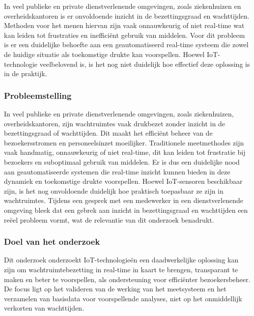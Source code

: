 

In veel publieke en private dienstverlenende omgevingen, zoals ziekenhuizen en overheidskantoren is er onvoldoende inzicht in de bezettingsgraad en wachttijden. Methoden voor het menen hiervan zijn vaak onnauwkeurig of niet real-time wat kan leiden tot frustraties en inefficiënt gebruik van middelen. Voor dit probleem is er een duidelijke behoefte aan een geautomatiseerd real-time systeem die zowel de huidige situatie als toekomstige drukte kan voorspellen. Hoewel IoT-technologie veelbelovend is, is het nog niet duidelijk hoe effectief deze oplossing is in de praktijk.

\subsubsection*{Probleemstelling}
In veel publieke en private dienstverlenende omgevingen, zoals ziekenhuizen, overheidskantoren, zijn wachtruimtes vaak drukbezet zonder inzicht in de bezettingsgraad of wachttijden. Dit maakt het efficiënt beheer van de bezoekersstromen en personeelsinzet moeilijker. Traditionele meetmethodes zijn vaak handmatig, onnauwkeurig of niet real-time, dit kan leiden tot frustratie bij bezoekers en suboptimaal gebruik van middelen. Er is dus een duidelijke nood aan geautomatiseerde systemen die real-time inzicht kunnen bieden in deze dynamiek en toekomstige drukte voorspellen. Hoewel IoT-sensoren beschikbaar zijn, is het nog onvoldoende duidelijk hoe praktisch toepasbaar ze zijn in wachtruimtes. Tijdens een gesprek met een medewerker in een dienstverlenende omgeving bleek dat een gebrek aan inzicht in bezettingsgraad en  wachttijden een reëel probleem vormt, wat de relevantie van dit onderzoek benadrukt.


\subsubsection*{Doel van het onderzoek}
Dit onderzoek onderzoekt IoT-technologieën een daadwerkelijke oplossing kan zijn om wachtruimtebezetting in real-time in kaart te brengen, transparant te maken en beter te voorspellen, als ondersteuning voor efficiënter bezoekersbeheer. De focus ligt op het valideren van de werking van het meetsysteem en het verzamelen van basisdata voor voorspellende analyses, niet op het onmiddellijk verkorten van wachttijden.


